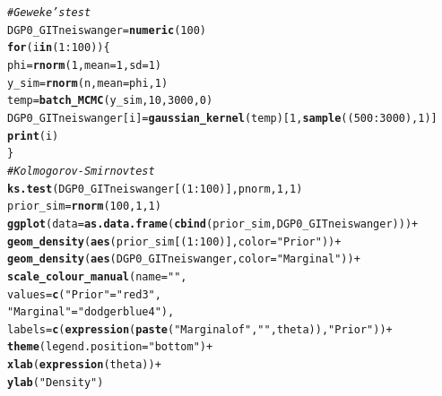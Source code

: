 \documentclass[11pt,a4paper]{report}\usepackage[]{graphicx}\usepackage[]{color}
\makeatletter
\newcommand{\hlnum}[1]{\textcolor[rgb]{0.686,0.059,0.569}{#1}}%
\newcommand{\hlstr}[1]{\textcolor[rgb]{0.192,0.494,0.8}{#1}}%
\newcommand{\hlcom}[1]{\textcolor[rgb]{0.678,0.584,0.686}{\textit{#1}}}%
\newcommand{\hlopt}[1]{\textcolor[rgb]{0,0,0}{#1}}%
\newcommand{\hlstd}[1]{\textcolor[rgb]{0.345,0.345,0.345}{#1}}%
\newcommand{\hlkwa}[1]{\textcolor[rgb]{0.161,0.373,0.58}{\textbf{#1}}}%
\newcommand{\hlkwb}[1]{\textcolor[rgb]{0.69,0.353,0.396}{#1}}%
\newcommand{\hlkwc}[1]{\textcolor[rgb]{0.333,0.667,0.333}{#1}}%
\newcommand{\hlkwd}[1]{\textcolor[rgb]{0.737,0.353,0.396}{\textbf{#1}}}%
\newenvironment{kframe}{%
 \def\at@end@of@kframe{}%
 \ifinner\ifhmode%
  \def\at@end@of@kframe{\end{minipage}}%
  \begin{minipage}{\columnwidth}%
 \fi\fi%
 \def\FrameCommand##1{\hskip\@totalleftmargin \hskip-\fboxsep
 \colorbox{shadecolor}{##1}\hskip-\fboxsep
     \hskip-\linewidth \hskip-\@totalleftmargin \hskip\columnwidth}%
 \MakeFramed {\advance\hsize-\width
   \@totalleftmargin\z@ \linewidth\hsize
   \@setminipage}}%
 {\par\unskip\endMakeFramed%
 \at@end@of@kframe}
\newenvironment{knitrout}{}{} %
\makeatother
\begin{document}
\begin{appendix}
\begin{knitrout}
\begin{kframe}
\begin{alltt}
\hlcom{#Geweke's test}
\hlstd{DGP0_GITneiswanger}\hlkwb{=}\hlkwd{numeric}\hlstd{(}\hlnum{100}\hlstd{)}
\hlkwa{for} \hlstd{(i} \hlkwa{in} \hlstd{(}\hlnum{1}\hlopt{:}\hlnum{100}\hlstd{)) \{}
  \hlstd{phi}\hlkwb{=}\hlkwd{rnorm}\hlstd{(}\hlnum{1}\hlstd{,}\hlkwc{mean}\hlstd{=}\hlnum{1}\hlstd{,}\hlkwc{sd}\hlstd{=}\hlnum{1}\hlstd{)}
  \hlstd{y_sim}\hlkwb{=}\hlkwd{rnorm}\hlstd{(n,}\hlkwc{mean} \hlstd{= phi,}\hlnum{1}\hlstd{)}
  \hlstd{temp}\hlkwb{=}\hlkwd{batch_MCMC}\hlstd{(y_sim,}\hlnum{10}\hlstd{,}\hlnum{3000}\hlstd{,}\hlnum{0}\hlstd{)}
  \hlstd{DGP0_GITneiswanger[i]}\hlkwb{=}\hlkwd{gaussian_kernel}\hlstd{(temp)[}\hlnum{1}\hlstd{,}\hlkwd{sample}\hlstd{((}\hlnum{500}\hlopt{:}\hlnum{3000}\hlstd{),}\hlnum{1}\hlstd{)]}
  \hlkwd{print}\hlstd{(i)}
\hlstd{\}}
\hlcom{#Kolmogorov-Smirnov test}
\hlkwd{ks.test}\hlstd{(DGP0_GITneiswanger[(}\hlnum{1}\hlopt{:}\hlnum{100}\hlstd{)],pnorm,}\hlnum{1}\hlstd{,}\hlnum{1}\hlstd{)}
\hlstd{prior_sim}\hlkwb{=}\hlkwd{rnorm}\hlstd{(}\hlnum{100}\hlstd{,}\hlnum{1}\hlstd{,}\hlnum{1}\hlstd{)}
\hlkwd{ggplot}\hlstd{(}\hlkwc{data}\hlstd{=}\hlkwd{as.data.frame}\hlstd{(}\hlkwd{cbind}\hlstd{(prior_sim,DGP0_GITneiswanger)))}\hlopt{+}
  \hlkwd{geom_density}\hlstd{(}\hlkwd{aes}\hlstd{(prior_sim[(}\hlnum{1}\hlopt{:}\hlnum{100}\hlstd{)],} \hlkwc{color}\hlstd{=}\hlstr{"Prior"}\hlstd{))}\hlopt{+}
  \hlkwd{geom_density}\hlstd{(}\hlkwd{aes}\hlstd{(DGP0_GITneiswanger,}\hlkwc{color}\hlstd{=}\hlstr{"Marginal"}\hlstd{))}\hlopt{+}
  \hlkwd{scale_colour_manual}\hlstd{(}\hlkwc{name}\hlstd{=}\hlstr{""}\hlstd{,}
                      \hlkwc{values}\hlstd{=}\hlkwd{c}\hlstd{(}\hlstr{"Prior"}\hlstd{=}\hlstr{"red3"}\hlstd{,}
                               \hlstr{"Marginal"}\hlstd{=}\hlstr{"dodgerblue4"}\hlstd{),}
                      \hlkwc{labels}\hlstd{=}\hlkwd{c}\hlstd{(}\hlkwd{expression}\hlstd{(}\hlkwd{paste}\hlstd{(}\hlstr{"Marginal of"}\hlstd{,} \hlstr{" "}\hlstd{, theta)),}\hlstr{"Prior"}\hlstd{))}\hlopt{+}
  \hlkwd{theme}\hlstd{(}\hlkwc{legend.position}\hlstd{=}\hlstr{"bottom"}\hlstd{)}\hlopt{+}
  \hlkwd{xlab}\hlstd{(}\hlkwd{expression}\hlstd{(theta))}\hlopt{+}
  \hlkwd{ylab}\hlstd{(}\hlstr{"Density"}\hlstd{)}
\end{alltt}
\end{kframe}
\end{knitrout}

\restoregeometry
\end{appendix}
\end{document}
